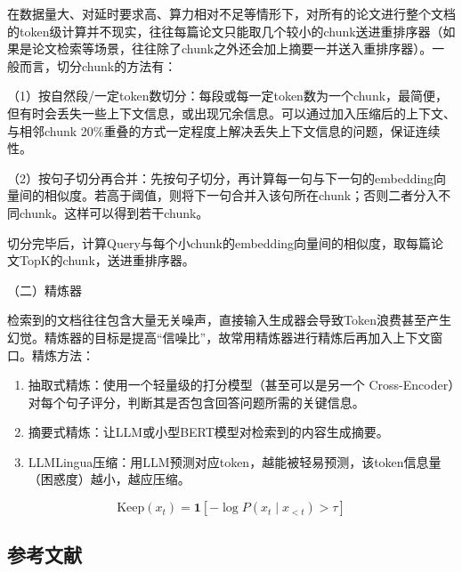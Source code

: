 在数据量大、对延时要求高、算力相对不足等情形下，对所有的论文进行整个文档的token级计算并不现实，往往每篇论文只能取几个较小的chunk送进重排序器（如果是论文检索等场景，往往除了chunk之外还会加上摘要一并送入重排序器）。一般而言，切分chunk的方法有：

（1）按自然段/一定token数切分：每段或每一定token数为一个chunk，最简便，但有时会丢失一些上下文信息，或出现冗余信息。可以通过加入压缩后的上下文、与相邻chunk 20\%重叠的方式一定程度上解决丢失上下文信息的问题，保证连续性。

（2）按句子切分再合并：先按句子切分，再计算每一句与下一句的embedding向量间的相似度。若高于阈值，则将下一句合并入该句所在chunk；否则二者分入不同chunk。这样可以得到若干chunk。

切分完毕后，计算Query与每个小chunk的embedding向量间的相似度，取每篇论文TopK的chunk，送进重排序器。

（二）精炼器

检索到的文档往往包含大量无关噪声，直接输入生成器会导致Token浪费甚至产生幻觉。精炼器的目标是提高``信噪比''，故常用精炼器进行精炼后再加入上下文窗口。精炼方法：

\begin{enumerate}
\def\labelenumi{\arabic{enumi}.}
\item
  抽取式精炼：使用一个轻量级的打分模型（甚至可以是另一个 Cross-Encoder）对每个句子评分，判断其是否包含回答问题所需的关键信息。
\item
  摘要式精炼：让LLM或小型BERT模型对检索到的内容生成摘要。
\item
  LLMLingua压缩：用LLM预测对应token，越能被轻易预测，该token信息量（困惑度）越小，越应压缩。
\end{enumerate}

\[
\mathrm{Keep}(x_t)=\mathbf{1}\!\left[-\log P\!\left(x_t\mid x_{<t}\right)>\tau\right]
\]

\FloatBarrier
{}
\hypertarget{ux53c2ux8003ux6587ux732e-125}{%
\subsection{参考文献}\label{ux53c2ux8003ux6587ux732e-125}}

